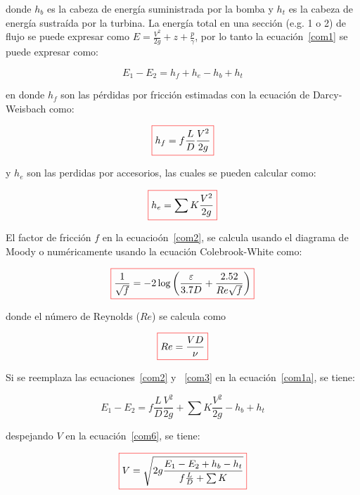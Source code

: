 \documentclass[10pt, oneside]{article}
\begin{document}
donde $h_b$ es la cabeza de energ\'ia suministrada por la bomba y $h_t$ es la cabeza de energ\'ia sustra\'ida por la turbina. La energ\'ia total en una secci\'on (e.g. 1 o 2) de flujo se puede expresar como $E = \frac{{V}^2}{2g}+ z + \frac{p}{\gamma}$, por lo tanto la ecuaci\'on~\ref{com1} se puede expresar como:

\begin{equation}
E_1 - E_2 = h_f + h_e - h_b + h_t
\label{com1a}
\end{equation}

en donde $h_f$ son las p\'erdidas por fricci\'on   estimadas con la ecuaci\'on de Darcy-Weisbach como:

\begin{equation}
\color{red}\boxed{\color{black} h_f = f \frac{L}{D}\frac{V^2}{2g} }
\label{com2}
\end{equation}

y $h_e$ son las perdidas por accesorios, las cuales se pueden calcular como:

\begin{equation}
\color{red}\boxed{\color{black} h_e = \sum K \frac{V^2}{2g} }
\label{com3}
\end{equation}

El factor de fricci\'on $f$ en la ecuacio\'on~\ref{com2}, se calcula usando el diagrama de Moody o num\'ericamente usando la ecuaci\'on Colebrook-White como:
 
\begin{equation}
\color{red}\boxed{\color{black}  \frac{1}{\sqrt{f}}= -2 \log \left( \frac{\varepsilon}{3.7D} + \frac{2.52}{Re \sqrt{f}} \right) }
\label{com4}
\end{equation}

donde el n\'umero de Reynolds ($Re$) se calcula como

\begin{equation}
\color{red}\boxed{\color{black} Re = \frac{VD}{\nu} } 
\label{com5}
\end{equation}

Si se reemplaza las ecuaciones~\ref{com2} y ~\ref{com3} en la ecuaci\'on~\ref{com1a}, se tiene:

\begin{equation}
E_1 - E_2 =  f \frac{L}{D}\frac{V^2}{2g} + \sum K \frac{V^2}{2g} - h_b + h_t
\label{com6}
\end{equation}

despejando $V$ en la ecuaci\'on~\ref{com6}, se tiene:
 
\begin{equation}
\color{red}\boxed{\color{black} V = \sqrt{2g\frac{E_1 - E_2 + h_b - h_t}{f\frac{L}{D} + \sum K } } }
\label{com7}
\end{equation}
\end{document}

